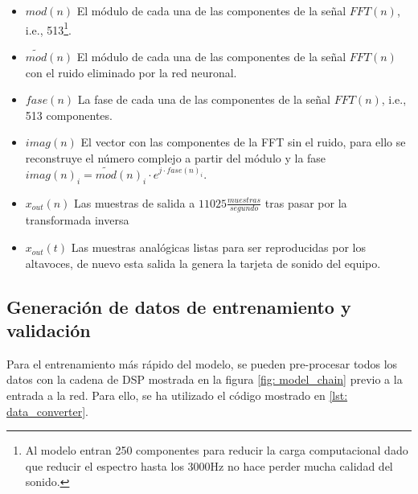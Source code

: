 \begin{itemize}
\begin{center}
 	\end{center}
 	\item $mod(n)$ El módulo de cada una de las componentes de la señal $FFT(n)$, i.e., 513\footnote{Al modelo entran 250 componentes para reducir la carga computacional dado que reducir el espectro hasta los 3000Hz no hace perder mucha calidad del sonido.}.
 	\item $\widetilde{mod}(n)$ El módulo de cada una de las componentes de la señal $FFT(n)$ con el ruido eliminado por la red neuronal.
 	\item $fase(n)$ La fase de cada una de las componentes de la señal $FFT(n)$, i.e., 513 componentes.
 	\item $imag(n)$ El vector con las componentes de la \gls{FFT} sin el ruido, para ello se reconstruye el número complejo a partir del módulo y la fase $imag(n)_i = \widetilde{mod}(n)_i\cdot e^{j\cdot fase(n)_i}$.
 	\item $x_{out}(n)$ Las muestras de salida a $11025\frac{muestras}{segundo}$ tras pasar por la transformada inversa
 	\item $x_{out}(t)$ Las muestras analógicas listas para ser reproducidas por los altavoces, de nuevo esta salida la genera la tarjeta de sonido del equipo.
\end{itemize}

\subsection{Generación de datos de entrenamiento y validación}
Para el entrenamiento más rápido del modelo, se pueden pre-procesar todos los datos con la cadena de \gls{DSP} mostrada en la figura \ref{fig: model_chain} previo a la entrada a la red. Para ello, se ha utilizado el código mostrado en \ref{lst: data_converter}.

